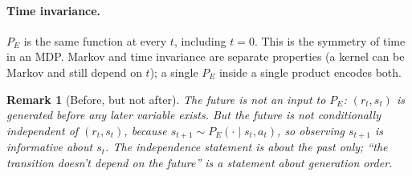 \documentclass[11pt]{article}
\newtheorem*{remark}{Remark}
\begin{document}
\paragraph{Time invariance.} $P_E$ is the same function at every $t$, including
$t = 0$. This is the symmetry of time in an MDP. Markov and time invariance are
separate properties (a kernel can be Markov and still depend on $t$); a single
$P_E$ inside a single product encodes both.

\begin{remark}[Before, but not after]
The future is not an input to $P_E$: $(r_t, s_t)$ is generated before any later
variable exists. But the future is \emph{not} conditionally independent of
$(r_t, s_t)$, because $s_{t+1} \sim P_E(\cdot \mid s_t, a_t)$, so observing
$s_{t+1}$ is informative about $s_t$. The independence statement is about the
past only; ``the transition doesn't depend on the future'' is a statement about
generation order.
\end{remark}
\end{document}
